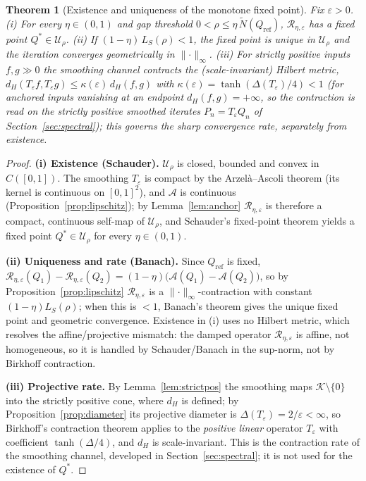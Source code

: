 \documentclass[11pt]{article}
\theoremstyle{plain}
\newtheorem{theorem}{Theorem}[section]
\theoremstyle{definition}
\theoremstyle{remark}
\newcommand{\Rc}{\mathcal R}
\newcommand{\Ac}{\mathcal A}
\begin{document}
\begin{theorem}[Existence and uniqueness of the monotone fixed point]\label{thm:fixedpoint}
Fix $\varepsilon>0$. \emph{(i)} For every $\eta\in(0,1)$ and gap threshold $0<\rho\le\eta\,\tilde N(Q_{\mathrm{ref}})$, $\Rc_{\eta,\varepsilon}$ has a fixed point $Q^*\in\mathcal U_\rho$. \emph{(ii)} If $(1-\eta)\,L_S(\rho)<1$, the fixed point is unique in $\mathcal U_\rho$ and the iteration converges geometrically in $\lVert\cdot\rVert_\infty$. \emph{(iii)} For strictly positive inputs $f,g\gg0$ the smoothing channel contracts the (scale-invariant) Hilbert metric, $d_H(T_\varepsilon f,T_\varepsilon g)\le\kappa(\varepsilon)\,d_H(f,g)$ with $\kappa(\varepsilon)=\tanh(\Delta(T_\varepsilon)/4)<1$ (for anchored inputs vanishing at an endpoint $d_H(f,g)=+\infty$, so the contraction is read on the strictly positive smoothed iterates $P_n=T_\varepsilon Q_n$ of Section~\ref{sec:spectral}); this governs the sharp convergence \emph{rate}, separately from existence.
\end{theorem}
\begin{proof}
\textbf{(i) Existence (Schauder).} $\mathcal U_\rho$ is closed, bounded and convex in $C([0,1])$. The smoothing $T_\varepsilon$ is compact by the Arzel\`a--Ascoli theorem (its kernel is continuous on $[0,1]^2$), and $\Ac$ is continuous (Proposition~\ref{prop:lipschitz}); by Lemma~\ref{lem:anchor} $\Rc_{\eta,\varepsilon}$ is therefore a compact, continuous self-map of $\mathcal U_\rho$, and Schauder's fixed-point theorem \citep{deimling1985} yields a fixed point $Q^*\in\mathcal U_\rho$ for every $\eta\in(0,1)$.

\textbf{(ii) Uniqueness and rate (Banach).} Since $Q_{\mathrm{ref}}$ is fixed, $\Rc_{\eta,\varepsilon}(Q_1)-\Rc_{\eta,\varepsilon}(Q_2)=(1-\eta)\big(\Ac(Q_1)-\Ac(Q_2)\big)$, so by Proposition~\ref{prop:lipschitz} $\Rc_{\eta,\varepsilon}$ is a $\lVert\cdot\rVert_\infty$-contraction with constant $(1-\eta)L_S(\rho)$; when this is $<1$, Banach's theorem \citep{banach1922} gives the unique fixed point and geometric convergence. Existence in (i) uses no Hilbert metric, which resolves the affine/projective mismatch: the damped operator $\Rc_{\eta,\varepsilon}$ is affine, not homogeneous, so it is handled by Schauder/Banach in the sup-norm, not by Birkhoff contraction.

\textbf{(iii) Projective rate.} By Lemma~\ref{lem:strictpos} the smoothing maps $\mathcal K\setminus\{0\}$ into the strictly positive cone, where $d_H$ is defined; by Proposition~\ref{prop:diameter} its projective diameter is $\Delta(T_\varepsilon)=2/\varepsilon<\infty$, so Birkhoff's contraction theorem \citep{birkhoff1957,bushell1973,evesonnussbaum1995} applies to the \emph{positive linear} operator $T_\varepsilon$ with coefficient $\tanh(\Delta/4)$, and $d_H$ is scale-invariant. This is the contraction rate of the smoothing channel, developed in Section~\ref{sec:spectral}; it is not used for the existence of $Q^*$.
\end{proof}
\end{document}
